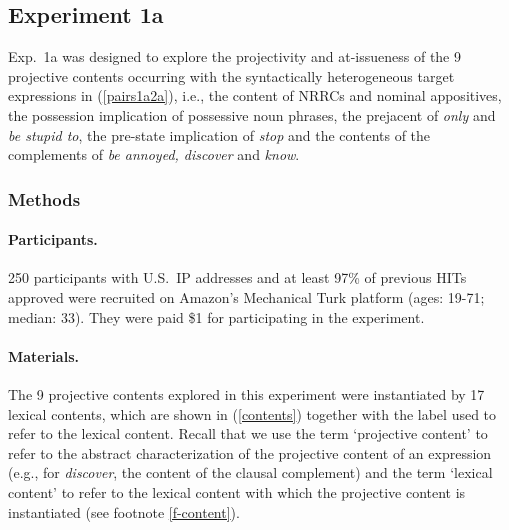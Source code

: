 \documentclass[11pt,fleqn]{article}
\newcommand{\6}{\mbox{$[\hspace*{-.6mm}[$}}
\newcommand{\9}{\mbox{$]\hspace*{-.6mm}]$}}
\begin{document}
\subsection{Experiment 1a}\label{s-exp1a}

Exp.~1a was designed to explore the projectivity and at-issueness of the 9 projective contents occurring with the syntactically heterogeneous target expressions in (\ref{pairs1a2a}), i.e., the content of NRRCs and nominal appositives, the possession implication of possessive noun phrases, the prejacent of {\em only} and {\em be stupid to}, the pre-state implication of {\em stop} and the contents of the complements of {\em be annoyed, discover} and {\em know}.

\subsubsection{Methods}\label{s-methods-1a}

\paragraph{Participants.} 250 participants with U.S.\ IP addresses and at least 97\% of previous HITs approved were recruited on Amazon's Mechanical Turk platform (ages: 19-71; median: 33). They were paid \$1 for participating in the experiment. 

\paragraph{Materials.} The 9 projective contents explored in this experiment were instantiated by 17 lexical contents, which are shown in (\ref{contents}) together with the label used to refer to the lexical content. Recall that we use the term `projective content' to refer to the abstract characterization of the projective content of an expression (e.g., for {\em discover}, the content of the clausal complement) and the term `lexical content' to refer to the lexical content with which the projective content is instantiated (see footnote \ref{f-content}).
\end{document}
